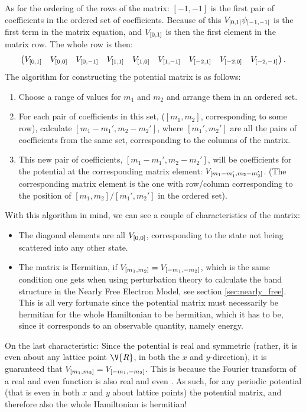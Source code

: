 \documentclass[main.tex]{subfiles}
\begin{document}
	As for the ordering of the rows of the matrix: $ [-1, -1] $ is the first pair of coefficients in the ordered set of coefficients. Because of this $ V_{[0, 1]} \psi_{[-1,-1]}$ is the first term in the matrix equation, and $ V_{[0, 1]} $ is then the first element in the matrix row. The whole row is then:
	\begin{equation}
		\begin{pmatrix}
			V_{[0, 1]} &  V_{[0, 0]} & V_{[0, -1]} & V_{[1, 1]} & V_{[1, 0]} & V_{[1,-1]} & V_{[-2, 1]} & V_{[-2, 0]} & V_{[-2, -1]}
		\end{pmatrix}.
	\end{equation}
	The algorithm for constructing the potential matrix is as follows:
	\begin{enumerate}
		\item Choose a range of values for $ m_1 $ and $ m_2 $ and arrange them in an ordered set.
		\item For each pair of coefficients in this set, ($ [m_1, m_2] $, corresponding to some row), calculate $ [m_1-m_1', m_2-m_2'] $, where $ [m_1', m_2'] $ are all the pairs of coefficients from the same set, corresponding to the columns of the matrix.
		\item This new pair of coefficients, $ [m_1-m_1', m_2-m_2'] $, will be coefficients for the potential at the corresponding matrix element: $ V_{[m_1-m_1', m_2-m_2']} $. (The corresponding matrix element is the one with row/column corresponding to the position of $ [m_1, m_2]/[m_1', m_2'] $ in the ordered set). 
	\end{enumerate}
	With this algorithm in mind, we can see a couple of characteristics of the matrix:
	\begin{itemize}
		\item The diagonal elements are all $ V_{[0,0]} $, corresponding to the state not being scattered into any other state.
		\item The matrix is Hermitian, if $ V_{[m_1, m_2]} = V_{[-m_1, -m_2]}$, which is the same condition one gets when using perturbation theory to calculate the band structure in the Nearly Free Electron Model, see section \ref{sec:nearly_free}. This is all very fortunate since the potential matrix must necessarily be hermitian for the whole Hamiltonian to be hermitian, which it has to be, since it corresponds to an observable quantity, namely energy.
	\end{itemize}
	On the last characteristic: Since the potential is real and symmetric (rather, it is even about any lattice point $ \V{R} $, in both the $ x $ and $ y $-direction), it is guaranteed that $ V_{[m_1, m_2]} = V_{[-m_1, -m_2]}$. This is because the Fourier transform of a real and even function is also real and even \cite{riley}. As such, for any periodic potential (that is even in both $ x $ and $ y $ about lattice points) the potential matrix, and therefore also the whole Hamiltonian is hermitian!
	
\end{document}
